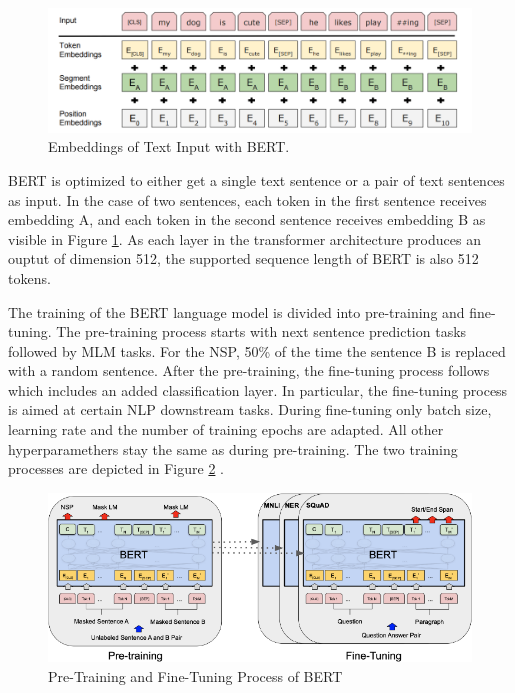 \begin{figure}[H]
	\centering
	\includegraphics[width=1\textwidth]{figures/bert_tokenizing.png}
	\caption{Embeddings of Text Input with BERT.}
	\label{fig:bert_tokenizing}
\end{figure}

BERT is optimized to either get a single text sentence or a pair of text sentences as input. In the case of two sentences, each token in the first sentence receives embedding A, and each token in the second sentence receives embedding B as visible in Figure \ref{fig:bert_tokenizing}. As each layer in the transformer architecture produces an ouptut of dimension 512, the supported sequence length of BERT is also 512 tokens. \newline

The training of the BERT language model is divided into pre-training and fine-tuning. The pre-training process starts with next sentence prediction tasks followed by MLM tasks. For the NSP, 50\% of the time the sentence B is replaced with a random sentence. After the pre-training, the fine-tuning process follows which includes an added classification layer. In particular, the fine-tuning process is aimed at certain NLP downstream tasks. During fine-tuning only batch size, learning rate and the number of training epochs are adapted. All other hyperparamethers stay the same as during pre-training. The two training processes are depicted in Figure \ref{fig:bert_training}\alert{ \cite{Devlin}}.

\begin{figure}[H]
	\centering
	\includegraphics[width=1\textwidth]{figures/bert_training.png}
	\caption{Pre-Training and Fine-Tuning Process of BERT}
	\label{fig:bert_training}
\end{figure}



